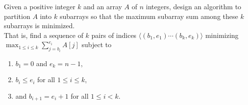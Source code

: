\begin{Exercise}[title=Path partition]
Given a positive integer $k$ and an array $A$ of $n$ integers, design an algorithm to partition $A$ into $k$ subarrays so that the maximum subarray sum among these $k$ subarrays is minimized.\\
That is, find a sequence of $k$ pairs of indices $\langle (b_1, e_1) \cdots (b_k, e_k) \rangle$ minimizing $\max_{1 \leq i \leq k} \sum_{j = b_i}^{e_i} A[j]$ subject to
\begin{enumerate} 
\item $b_1 = 0$ and $e_k = n - 1$,
\item $b_i \leq e_i$ for all $1 \leq i \leq k$,
\item and $b_{i + 1} = e_i + 1$ for all $1 \leq i < k$.
\end{enumerate}
\end{Exercise}
